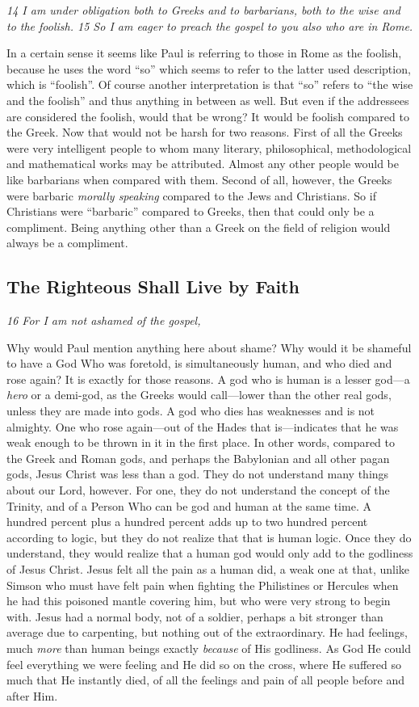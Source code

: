 \emph{14 I am under obligation both to Greeks and to barbarians, both to
the wise and to the foolish. 15 So I am eager to preach the gospel to
you also who are in Rome.}

In a certain sense it seems like Paul is referring to those in Rome as
the foolish, because he uses the word ``so'' which seems to refer to the
latter used description, which is ``foolish''. Of course another
interpretation is that ``so'' refers to ``the wise and the foolish'' and
thus anything in between as well. But even if the addressees are
considered the foolish, would that be wrong? It would be foolish
compared to the Greek. Now that would not be harsh for two reasons.
First of all the Greeks were very intelligent people to whom many
literary, philosophical, methodological and mathematical works may be
attributed. Almost any other people would be like barbarians when
compared with them. Second of all, however, the Greeks were barbaric
\emph{morally speaking} compared to the Jews and Christians. So if
Christians were ``barbaric'' compared to Greeks, then that could only be
a compliment. Being anything other than a Greek on the field of religion
would always be a compliment.

\subsection{The Righteous Shall Live by Faith} 
\emph{16 For I am not ashamed of the gospel,}

Why would Paul mention anything here about shame? Why would it be
shameful to have a God Who was foretold, is simultaneously human, and
who died and rose again? It is exactly for those reasons. A god who is
human is a lesser god---a \emph{hero} or a demi-god, as the Greeks would
call---lower than the other real gods, unless they are made into gods. A
god who dies has weaknesses and is not almighty. One who rose
again---out of the Hades that is---indicates that he was weak enough to
be thrown in it in the first place. In other words, compared to the
Greek and Roman gods, and perhaps the Babylonian and all other pagan
gods, Jesus Christ was less than a god. They do not understand many
things about our Lord, however. For one, they do not understand the
concept of the Trinity, and of a Person Who can be god and human at the
same time. A hundred percent plus a hundred percent adds up to two
hundred percent according to logic, but they do not realize that that is
human logic. Once they do understand, they would realize that a human
god would only add to the godliness of Jesus Christ. Jesus felt all the
pain as a human did, a weak one at that, unlike Simson who must have
felt pain when fighting the Philistines or Hercules when he had this
poisoned mantle covering him, but who were very strong to begin with.
Jesus had a normal body, not of a soldier, perhaps a bit stronger than
average due to carpenting, but nothing out of the extraordinary. He had
feelings, much \emph{more} than human beings exactly \emph{because} of
His godliness. As God He could feel everything we were feeling and He
did so on the cross, where He suffered so much that He instantly died,
of all the feelings and pain of all people before and after Him.

